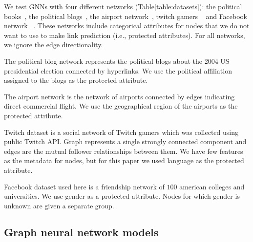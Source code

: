 \documentclass{article}
\theoremstyle{plain}
\theoremstyle{definition}
\theoremstyle{remark}
\begin{document}
We test GNNs with four different networks (Table\ref{table:datasets}):
the political books~\cite{nr}, the political blogs~\cite{10.1145/1134271.1134277}, the airport network~\cite{OpenFlig19:online}, twitch gamers  ~\cite{rozemberczki2021twitch} and Facebook network ~\cite{DBLP:journals/corr/abs-1102-2166}.
These networks include categorical attributes for nodes that we do not want to use to make link prediction (i.e., protected attributes).
For all networks, we ignore the edge directionality.

The political blog network represents the political blogs about the 2004 US presidential election connected by hyperlinks.
We use the political affiliation assigned to the blogs as the protected attribute.

The airport network is the network of airports connected by edges indicating direct commercial flight. 
We use the geographical region of the airports as the protected attribute.

Twitch dataset is a social network of Twitch gamers which was collected using public Twitch API. Graph represents a single strongly connected component and edges are the mutual follower relationships between them. We have few features as the metadata for nodes, but for this paper we used language as the protected attribute.

Facebook dataset used here is a friendship network of $100$ american colleges and universities. We use gender as a protected attribute. Nodes for which gender is unknown are given a separate group.



%

\subsection{Graph neural network models}
\end{document}
